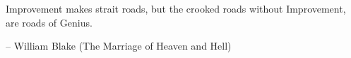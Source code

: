 Improvement makes strait roads,
but the crooked roads without Improvement,
are roads of Genius.

-- William Blake (The Marriage of Heaven and Hell)
